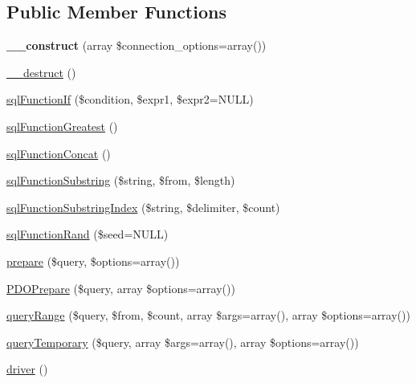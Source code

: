 \subsection*{Public Member Functions}
\begin{DoxyCompactItemize}
\item 
\hypertarget{classDatabaseConnection__sqlite_a81fadd0dc03035209962e51af85d33c4}{
{\bfseries \_\-\_\-construct} (array \$connection\_\-options=array())}
\label{classDatabaseConnection__sqlite_a81fadd0dc03035209962e51af85d33c4}

\item 
\hyperlink{classDatabaseConnection__sqlite_ad22467bf631a3f808f8cd90372e8514e}{\_\-\_\-destruct} ()
\item 
\hyperlink{classDatabaseConnection__sqlite_af784370971ff72b29f853466c42d1561}{sqlFunctionIf} (\$condition, \$expr1, \$expr2=NULL)
\item 
\hyperlink{classDatabaseConnection__sqlite_aed7d02bd21b71e91aae093937fbac0d1}{sqlFunctionGreatest} ()
\item 
\hyperlink{classDatabaseConnection__sqlite_a2010b85b6de63730c73214f75f6e5662}{sqlFunctionConcat} ()
\item 
\hyperlink{classDatabaseConnection__sqlite_a0523c014ec7d46a8a41ce949ba7f4434}{sqlFunctionSubstring} (\$string, \$from, \$length)
\item 
\hyperlink{classDatabaseConnection__sqlite_a11492dbbf74afed041b8dd14ec1d70f8}{sqlFunctionSubstringIndex} (\$string, \$delimiter, \$count)
\item 
\hyperlink{classDatabaseConnection__sqlite_aae54e984c066601c97c47328743cda1d}{sqlFunctionRand} (\$seed=NULL)
\item 
\hyperlink{classDatabaseConnection__sqlite_ab5d9ea6a6930649133f401149b18fa65}{prepare} (\$query, \$options=array())
\item 
\hyperlink{classDatabaseConnection__sqlite_a8e377488ebb6c76e61590ca3f5d7245c}{PDOPrepare} (\$query, array \$options=array())
\item 
\hyperlink{classDatabaseConnection__sqlite_a5c7aa6402ebb35a61c7753fa66ee6bd3}{queryRange} (\$query, \$from, \$count, array \$args=array(), array \$options=array())
\item 
\hyperlink{classDatabaseConnection__sqlite_a547c5fcee9fa8ef98e15f61ab83be6be}{queryTemporary} (\$query, array \$args=array(), array \$options=array())
\item 
\hyperlink{classDatabaseConnection__sqlite_aa941f2ff6edc55833dfa21b282c8c0dc}{driver} ()
\item 

\end{DoxyCompactItemize}
